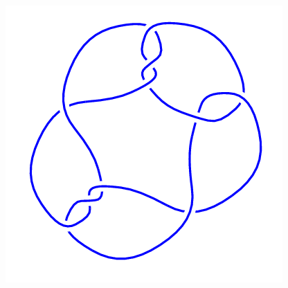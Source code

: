 \begin{figure}[H]
\begin{minipage}[b]{.18\linewidth}
	\end{minipage}
	\begin{minipage}[b]{.18\linewidth}
		\centering
		\includegraphics[width=\linewidth]{../data/10_76.png}
	\end{minipage}
\end{figure}

